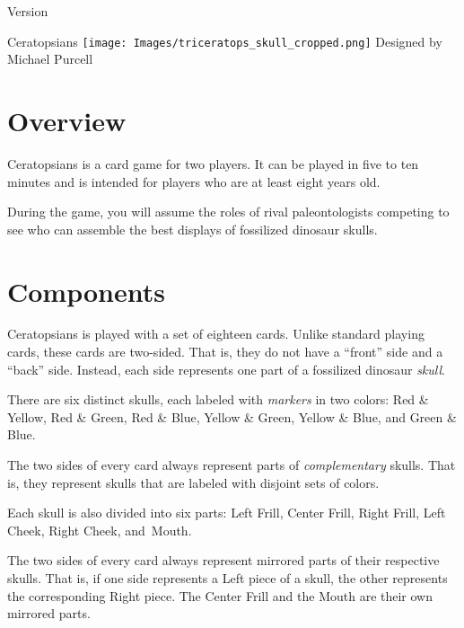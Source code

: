 \documentclass[a6paper, parskip=half, DIV=14, 10pt]{scrartcl}
\begin{document}
{%
\thispagestyle{empty}
		\enlargethispage{3.5\baselineskip} %
\setmainfont[Scale=1.0]{Tex Gyre Pagella}
\begin{center}
\makeatletter
{Version \@version}
\makeatother
\setmainfont[Scale=1.6]{Tex Gyre Pagella}

\Huge
Ceratopsians
\vfill{}
\texttt{[image: Images/triceratops\_skull\_cropped.png]}
\vfill{}
\normalsize
Designed by Michael Purcell
\end{center}
}%

\newpage
\setmainfont{Tex Gyre Pagella}%
\raggedright%
\section*{Overview}
Ceratopsians is a card game for two players. It can be played in five to ten minutes and is intended for players who are at least eight years old.

During the game, you will assume the roles of rival paleontologists competing to see who can assemble the best displays of fossilized dinosaur skulls.


\section*{Components}
Ceratopsians is played with a set of eighteen cards. Unlike standard playing cards, these cards are two-sided. That is, they do not have a ``front'' side and a ``back'' side. Instead, each side represents one part of a fossilized dinosaur \emph{skull}.

There are six distinct skulls, each labeled with \emph{markers} in two colors: Red \& Yellow, Red \& Green, Red \& Blue, Yellow \& Green, Yellow \& Blue, and Green \& Blue.

The two sides of every card always represent parts of \emph{complementary} skulls. That is, they represent skulls that are labeled with disjoint sets of colors.

\newpage

Each skull is also divided into six parts: Left Frill, Center Frill, Right Frill, Left Cheek, Right Cheek, and~Mouth.

The two sides of every card always represent mirrored parts of their respective skulls.  That is, if one side represents a Left piece of a skull, the other represents the corresponding Right piece.  The Center Frill and the Mouth are their own mirrored parts. 
\end{document}
